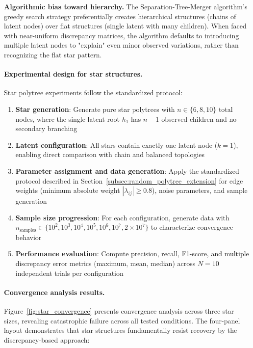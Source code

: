 \documentclass[11pt,a4paper]{article}
\numberwithin{equation}{section}
\begin{document}
\textbf{Algorithmic bias toward hierarchy.} The Separation-Tree-Merger algorithm's greedy search strategy preferentially creates hierarchical structures (chains of latent nodes) over flat structures (single latent with many children). When faced with near-uniform discrepancy matrices, the algorithm defaults to introducing multiple latent nodes to "explain" even minor observed variations, rather than recognizing the flat star pattern.

\paragraph{Experimental design for star structures.} Star polytree experiments follow the standardized protocol:

\begin{enumerate}[label=(\arabic*)]
\item \textbf{Star generation}: Generate pure star polytrees with $n \in \{6, 8, 10\}$ total nodes, where the single latent root $h_1$ has $n-1$ observed children and no secondary branching

\item \textbf{Latent configuration}: All stars contain exactly one latent node ($k=1$), enabling direct comparison with chain and balanced topologies

\item \textbf{Parameter assignment and data generation}: Apply the standardized protocol described in Section~\ref{subsec:random_polytree_extension} for edge weights (minimum absolute weight $|\lambda_{ij}| \geq 0.8$), noise parameters, and sample generation

\item \textbf{Sample size progression}: For each configuration, generate data with $n_{\text{samples}} \in \{10^2, 10^3, 10^4, 10^5, 10^6, 10^7, 2 \times 10^7\}$ to characterize convergence behavior

\item \textbf{Performance evaluation}: Compute precision, recall, F1-score, and multiple discrepancy error metrics (maximum, mean, median) across $N = 10$ independent trials per configuration
\end{enumerate}

\paragraph{Convergence analysis results.} Figure~\ref{fig:star_convergence} presents convergence analysis across three star sizes, revealing catastrophic failure across all tested conditions. The four-panel layout demonstrates that star structures fundamentally resist recovery by the discrepancy-based approach:
\end{document}

